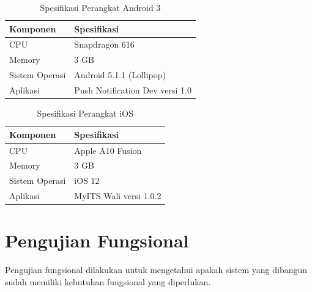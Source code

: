 \begin{longtable}{|p{3cm}|p{6cm}|}
\caption{Spesifikasi Perangkat Android 3} \label{t:spec-android-3} \\ \hline
\rowcolor{lightgray} Komponen & Spesifikasi \\ \hline
CPU & Snapdragon 616 \\ \hline
Memory & 3 GB \\ \hline
Sistem Operasi & Android 5.1.1 (Lollipop) \\ \hline
Aplikasi & Push Notification Dev versi 1.0 \\ \hline
\end{longtable}
\begin{longtable}{|p{3cm}|p{6cm}|}
	\caption{Spesifikasi Perangkat iOS} \label{t:spec-ios} \\ \hline
	\rowcolor{lightgray} Komponen & Spesifikasi \\ \hline
    CPU & Apple A10 Fusion \\ \hline
    Memory & 3 GB \\ \hline
    Sistem Operasi & iOS 12 \\ \hline
    Aplikasi & MyITS Wali versi 1.0.2 \\ \hline
\end{longtable}

\section{Pengujian Fungsional}
\par Pengujian fungsional dilakukan untuk mengetahui apakah sistem yang dibangun sudah memiliki kebutuhan fungsional yang diperlukan.

